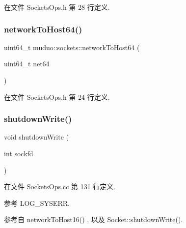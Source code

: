 在文件 Sockets\+Ops.\+h 第 28 行定义.

\mbox{\label{namespacemuduo_1_1sockets_ae5a926be124d52254860b4e93a5d1f31}} 
\subsubsection{\texorpdfstring{network\+To\+Host64()}{networkToHost64()}}
{\footnotesize\ttfamily uint64\+\_\+t muduo\+::sockets\+::network\+To\+Host64 (\begin{DoxyParamCaption}\item[{uint64\+\_\+t}]{net64 }\end{DoxyParamCaption})\hspace{0.3cm}{\ttfamily [inline]}}



在文件 Sockets\+Ops.\+h 第 24 行定义.

\mbox{\label{namespacemuduo_1_1sockets_a549ec5e856fec6f111aeb481cca9e622}} 
\subsubsection{\texorpdfstring{shutdown\+Write()}{shutdownWrite()}}
{\footnotesize\ttfamily void shutdown\+Write (\begin{DoxyParamCaption}\item[{int}]{sockfd }\end{DoxyParamCaption})}



在文件 Sockets\+Ops.\+cc 第 131 行定义.



参考 L\+O\+G\+\_\+\+S\+Y\+S\+E\+RR.



参考自 network\+To\+Host16() , 以及 Socket\+::shutdown\+Write().

